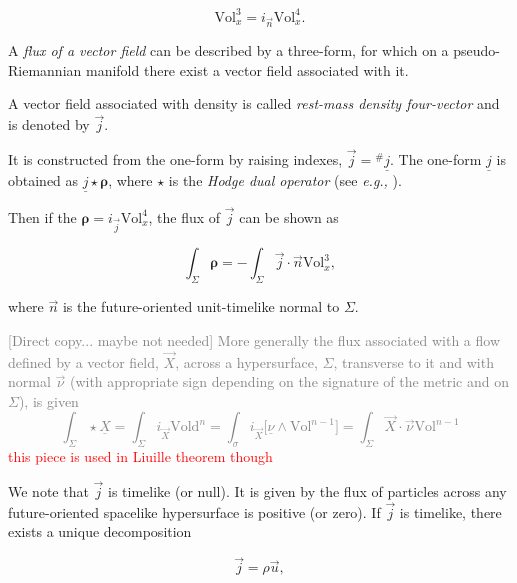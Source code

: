 \begin{equation}
\text{Vol}_x ^3 = i_{\vec{n}} \text{Vol}_x ^4.
\end{equation}

A \textit{flux of a vector field} can be described by a three-form, for which on a pseudo-Riemannian manifold there exist a vector field associated with it.

A vector field associated with density is called \textit{rest-mass density four-vector} and is denoted by $\vec{j}$.

It is constructed from the one-form by raising indexes, $\vec{j} = {^{\#}\underline{j}}$. 
The one-form $\underline{j}$ is obtained as $\underline{j}\star\boldsymbol{\rho}$, where $\star$ is the \textit{Hodge dual operator} (see \textit{e.g.,} \cite{Frankel:1982dva}). 

Then if the $\boldsymbol{\rho} = i_{\vec{j}}\text{Vol}_x ^4$, the flux of $\vec{j}$ can be shown as 

\begin{equation}
\int_{\Sigma} \boldsymbol{\rho} = - \int_{\Sigma}\vec{j}\cdot\vec{n}\text{Vol}_x ^3,
\end{equation}

where $\vec{n}$ is the future-oriented unit-timelike normal to $\Sigma$.

\textcolor{gray}{
    [Direct copy... maybe not needed] More generally the flux associated with a flow defined by a vector field, $\vec{X}$, across a hypersurface, $\Sigma$, transverse to it and with normal $\vec{\nu}$ (with appropriate sign depending on the signature of the metric and on $\Sigma$), is given 
    \begin{equation}
    \int_{\Sigma} \star\underline{X} = \int_{\Sigma}i_{\vec{X}}\text{Vold}^n = \int_{\sigma}i_{\vec{X}}\big[\underline{\nu}\wedge\text{Vol}^{n-1}\big] = \int_{\Sigma}\vec{X}\cdot\vec{\nu}\text{Vol}^{n-1}
    \label{eq:theory:flux_of_flow}
    \end{equation}
}
\textcolor{red}{this piece is used in Liuille theorem though}

We note that $\vec{j}$ is timelike (or null).
It is given by the flux of particles across any future-oriented spacelike hypersurface is positive (or zero). 
If $\vec{j}$ is timelike, there exists a unique decomposition 

\begin{equation}
\vec{j} = \rho \vec{u},
\label{eq:theory:defofjandu}
\end{equation}

